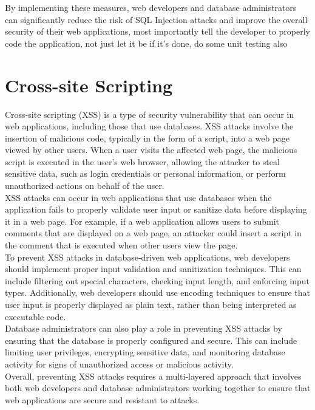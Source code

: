 \documentclass[11pt]{article}
\let\oldsection\section
\renewcommand\section{\clearpage\oldsection}
\begin{document}
By implementing these measures, web developers and database administrators can significantly reduce the risk of SQL Injection attacks and improve the overall security of their web applications, most importantly tell the developer to properly code the application, not just let it be if it's done, do some unit testing also\\

\section{Cross-site Scripting}
\label{sec:org09e7096}

Cross-site scripting (XSS) is a type of security vulnerability that can occur in web applications, including those that use databases. XSS attacks involve the insertion of malicious code, typically in the form of a script, into a web page viewed by other users. When a user visits the affected web page, the malicious script is executed in the user's web browser, allowing the attacker to steal sensitive data, such as login credentials or personal information, or perform unauthorized actions on behalf of the user.\\

XSS attacks can occur in web applications that use databases when the application fails to properly validate user input or sanitize data before displaying it in a web page. For example, if a web application allows users to submit comments that are displayed on a web page, an attacker could insert a script in the comment that is executed when other users view the page.\\

To prevent XSS attacks in database-driven web applications, web developers should implement proper input validation and sanitization techniques. This can include filtering out special characters, checking input length, and enforcing input types. Additionally, web developers should use encoding techniques to ensure that user input is properly displayed as plain text, rather than being interpreted as executable code.\\

Database administrators can also play a role in preventing XSS attacks by ensuring that the database is properly configured and secure. This can include limiting user privileges, encrypting sensitive data, and monitoring database activity for signs of unauthorized access or malicious activity.\\

Overall, preventing XSS attacks requires a multi-layered approach that involves both web developers and database administrators working together to ensure that web applications are secure and resistant to attacks.\\
\end{document}
